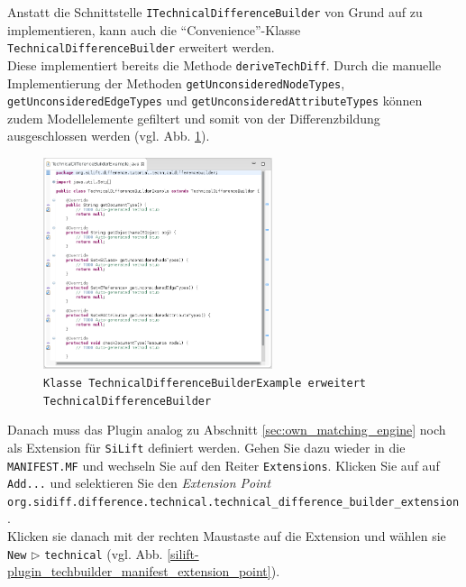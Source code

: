 Anstatt die Schnittstelle \texttt{ITechnicalDifferenceBuilder} von Grund auf zu implementieren, kann auch die ``Convenience''-Klasse \texttt{Technical\-Difference\-Builder} erweitert werden.\\
Diese implementiert bereits die Methode \texttt{deriveTechDiff}. Durch die manuelle Implementierung der Methoden \texttt{getUnconsideredNodeTypes}, \texttt{getUnconsideredEdgeTypes} und \texttt{getUnconsideredAttributeTypes} können zudem Modellelemente gefiltert und somit von der Differenzbildung ausgeschlossen werden (vgl. Abb. \ref{silift-plugin_techbuilder_techbuilder}).


\begin{figure}[H]
\centering
\includegraphics[width=0.6\textwidth]{techbuilder/graphics/silift-plugin_techbuilder_techbuilder.png}
\caption{\texttt{Klasse \texttt{TechnicalDifferenceBuilderExample} erweitert \texttt{TechnicalDifferenceBuilder}}}
\label{silift-plugin_techbuilder_techbuilder}
\end{figure}

Danach muss das Plugin analog zu Abschnitt \ref{sec:own_matching_engine} noch als Extension für \texttt{SiLift} definiert werden.
Gehen Sie dazu wieder in die \texttt{MANIFEST.MF} und wechseln Sie auf den Rei\-ter \texttt{Extensions}. Klicken Sie auf auf \texttt{Add...} und selektieren Sie den \textit{Extension Point} \texttt{org.sidiff.difference.technical.technical\_difference\_builder\_extension} .\\
Klicken sie danach mit der rechten Maustaste auf die Extension und wählen sie \texttt{New} $\triangleright$ \texttt{technical} (vgl. Abb. \ref{silift-plugin_techbuilder_manifest_extension_point}).

